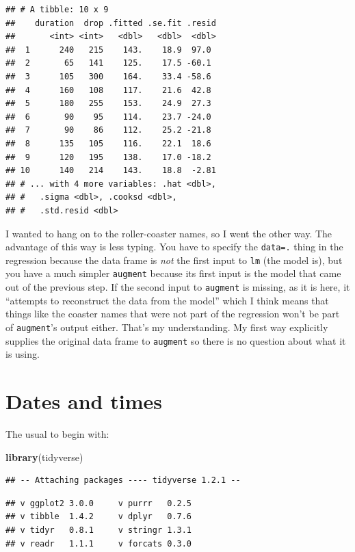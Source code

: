 \documentclass[]{tufte-book}
\newenvironment{Shaded}{}{}
\newcommand{\KeywordTok}[1]{\textcolor[rgb]{0.00,0.44,0.13}{\textbf{#1}}}
\newcommand{\NormalTok}[1]{#1}
\theoremstyle{definition}
\theoremstyle{definition}
\theoremstyle{definition}
\theoremstyle{remark}
\begin{document}
\begin{verbatim}
## # A tibble: 10 x 9
##    duration  drop .fitted .se.fit .resid
##       <int> <int>   <dbl>   <dbl>  <dbl>
##  1      240   215    143.    18.9  97.0 
##  2       65   141    125.    17.5 -60.1 
##  3      105   300    164.    33.4 -58.6 
##  4      160   108    117.    21.6  42.8 
##  5      180   255    153.    24.9  27.3 
##  6       90    95    114.    23.7 -24.0 
##  7       90    86    112.    25.2 -21.8 
##  8      135   105    116.    22.1  18.6 
##  9      120   195    138.    17.0 -18.2 
## 10      140   214    143.    18.8  -2.81
## # ... with 4 more variables: .hat <dbl>,
## #   .sigma <dbl>, .cooksd <dbl>,
## #   .std.resid <dbl>
\end{verbatim}

I wanted to hang on to the roller-coaster names, so I went the other
way. The advantage of this way is less typing. You have to specify the
\texttt{data=.} thing in the regression because the data frame is
\emph{not} the first input to \texttt{lm} (the model is), but you have a
much simpler \texttt{augment} because its first input is the model that
came out of the previous step. If the second input to \texttt{augment}
is missing, as it is here, it ``attempts to reconstruct the data from
the model''  which I
think means that things like the coaster names that were not part of the
regression won't be part of \texttt{augment}'s output either. That's my
understanding. My first way explicitly supplies the original data frame
to \texttt{augment} so there is no question about what it is using.

\hypertarget{dates-and-times}{%
\chapter{Dates and times}\label{dates-and-times}}

The usual to begin with:

\begin{Shaded}
\begin{Highlighting}[]
\KeywordTok{library}\NormalTok{(tidyverse)}
\end{Highlighting}
\end{Shaded}

\begin{verbatim}
## -- Attaching packages ---- tidyverse 1.2.1 --
\end{verbatim}

\begin{verbatim}
## v ggplot2 3.0.0     v purrr   0.2.5
## v tibble  1.4.2     v dplyr   0.7.6
## v tidyr   0.8.1     v stringr 1.3.1
## v readr   1.1.1     v forcats 0.3.0
\end{verbatim}
\end{document}
